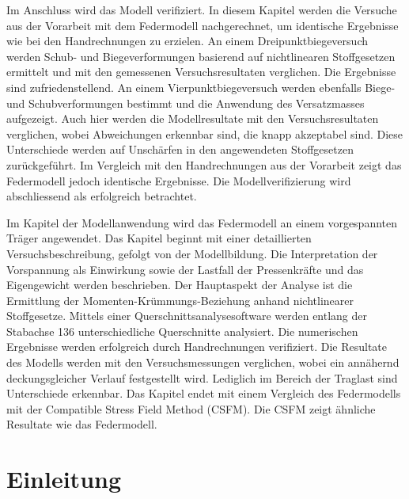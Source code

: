\documentclass[
  11pt,
  letterpaper,
]{scrreprt}
\renewcommand*\contentsname{Inhaltsverzeichnis}
\newcommand\contentsname{Inhaltsverzeichnis}
\begin{document}
Im Anschluss wird das Modell verifiziert. In diesem Kapitel werden die Versuche aus der Vorarbeit mit dem Federmodell nachgerechnet, um identische Ergebnisse wie bei den Handrechnungen zu erzielen. An einem Dreipunktbiegeversuch werden Schub- und Biegeverformungen basierend auf nichtlinearen Stoffgesetzen ermittelt und mit den gemessenen Versuchsresultaten verglichen. Die Ergebnisse sind zufriedenstellend. An einem Vierpunktbiegeversuch werden ebenfalls Biege- und Schubverformungen bestimmt und die Anwendung des Versatzmasses aufgezeigt. Auch hier werden die Modellresultate mit den Versuchsresultaten verglichen, wobei Abweichungen erkennbar sind, die knapp akzeptabel sind. Diese Unterschiede werden auf Unschärfen in den angewendeten Stoffgesetzen zurückgeführt. Im Vergleich mit den Handrechnungen aus der Vorarbeit zeigt das Federmodell jedoch identische Ergebnisse. Die Modellverifizierung wird abschliessend als erfolgreich betrachtet.

Im Kapitel der Modellanwendung wird das Federmodell an einem vorgespannten Träger angewendet. Das Kapitel beginnt mit einer detaillierten Versuchsbeschreibung, gefolgt von der Modellbildung. Die Interpretation der Vorspannung als Einwirkung sowie der Lastfall der Pressenkräfte und das Eigengewicht werden beschrieben. Der Hauptaspekt der Analyse ist die Ermittlung der Momenten-Krümmungs-Beziehung anhand nichtlinearer Stoffgesetze. Mittels einer Querschnittsanalysesoftware werden entlang der Stabachse 136 unterschiedliche Querschnitte analysiert. Die numerischen Ergebnisse werden erfolgreich durch Handrechnungen verifiziert. Die Resultate des Modells werden mit den Versuchsmessungen verglichen, wobei ein annähernd deckungsgleicher Verlauf festgestellt wird. Lediglich im Bereich der Traglast sind Unterschiede erkennbar. Das Kapitel endet mit einem Vergleich des Federmodells mit der Compatible Stress Field Method (CSFM). Die CSFM zeigt ähnliche Resultate wie das Federmodell.


\renewcommand*\contentsname{Inhaltsverzeichnis}
{
\hypersetup{linkcolor=}
\setcounter{tocdepth}{1}
\tableofcontents
}
\listoffigures


\chapter{Einleitung}\label{einleitung}
\end{document}
